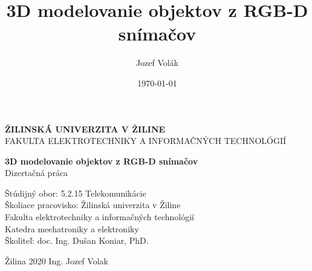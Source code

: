 \documentclass[12pt,oneside,a4paper]{report}
\title{3D modelovanie objektov z RGB-D snímačov}
\author{Jozef Volák}
\date{\today}
\begin{document}
	
	\begin{titlepage}
		\begin{center}
			\Large
			\textbf{ŽILINSKÁ UNIVERZITA V ŽILINE} \\
			\large
			FAKULTA ELEKTROTECHNIKY A INFORMAČNÝCH TECHNOLÓGIÍ \\
		\end{center}	
	
		\vfill
		\begin{center}
		\large
			\textbf{3D modelovanie objektov z RGB-D snímačov} \\
			Dizertačná práca
		\end{center}
		\vfill
	
		\noindent Štúdijný obor: \tabto{4cm} 5.2.15 Telekomunikácie \\
		Školiace pracovisko: \tabto{4cm} Žilinská univerzita v Žiline \\
		\tabto{4cm} Fakulta elektrotechniky a informačných technológií  \\
		\tabto{4cm} Katedra mechatroniky a elektroniky \\
		Školiteľ: \tabto{4cm} doc. Ing. Dušan Koniar, PhD. \\
		\vspace{15px}
		\begin{center}
		Žilina 2020 \hfill Ing. Jozef Volak
		\end{center}
	\end{titlepage}

	\clearpage
	
	
	\setcounter{page}{1} %
	

	\hypersetup{%
		,urlcolor=black
		,citecolor=black
		,linkcolor=black
	}

	\tableofcontents
	
	\hypersetup{%
		,urlcolor=MidnightBlue
		,citecolor=RoyalBlue
		,linkcolor=red
	}


	\clearpage		%
	\printacronyms[include-classes=symbol,name=Zoznam symbolov] %
	\clearpage		%
	\acuseall		%
	\printacronyms[include-classes=abbrev,name=Zoznam skratiek] %
	
\end{document}
